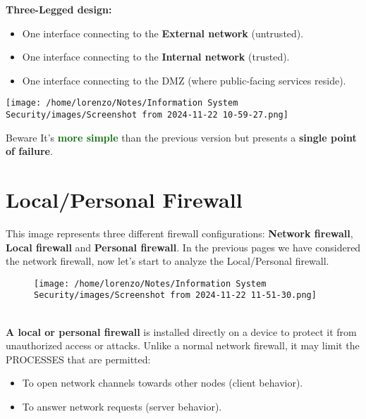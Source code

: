 \begin{minipage}{0.4\textwidth}
    \textbf{Three-Legged design:}
    \begin{itemize}
        \item One interface connecting to the \textbf{External network} (untrusted).
        \item One interface connecting to the \textbf{Internal network} (trusted).
        \item One interface connecting to the DMZ (where public-facing services reside).
    \end{itemize}
\end{minipage} 
\hfill
\begin{minipage}{0.6\textwidth}
    \centering
    \texttt{[image: 
        /home/lorenzo/Notes/Information System Security/images/Screenshot from 2024-11-22 10-59-27.png]}
\end{minipage}

\begin{center}
    \begin{quotebox-red}{Beware}
      It's \textcolor{darkgreen}{\textbf{more simple}} than the previous version but presents a \textbf{single point of failure}.
    \end{quotebox-red}   
\end{center}
\noindent{\color{gray!50}\rule{\textwidth}{0.5pt}}

\section{Local/Personal Firewall}
This image represents three different firewall configurations: \textbf{Network firewall}, \textbf{Local firewall} and \textbf{Personal firewall}. In the previous pages we have considered the network firewall, now let's start to analyze the Local/Personal firewall. \\
\begin{figure}[h]
    \centering
    \texttt{[image: /home/lorenzo/Notes/Information System Security/images/Screenshot from 2024-11-22 11-51-30.png]}
\end{figure}
\\
\noindent
\textbf{A local or personal firewall} is installed directly on a device to protect it from unauthorized access or attacks. Unlike a normal network firewall, it may limit the PROCESSES that are permitted:
\begin{itemize}
    \item To open network channels towards other nodes (client behavior).
    \item To answer network requests (server behavior).
\end{itemize}

